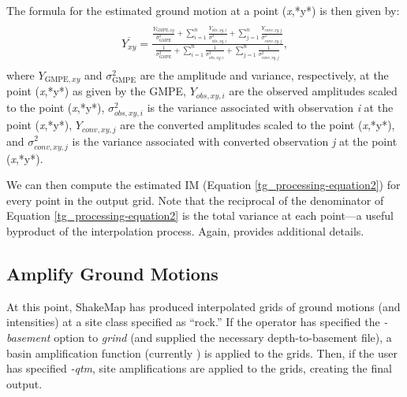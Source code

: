 \documentclass[letterpaper,10pt,english]{sphinxmanual}
\begin{document}
The formula for the estimated ground motion at a point (\emph{x},*y*) is then given by:
\label{tg_processing:equation-equation2}\begin{align}\label{tg_processing-equation2}\begin{aligned}
\begin{split}\overline{Y_{xy}} = \frac{\displaystyle\frac{Y_{\text{GMPE},xy}}{\sigma_{\text{GMPE}}^2} + \displaystyle\sum_{i=1}^{n}\frac{Y_{obs,xy,i}}{\sigma_{obs,xy,i}^2} + \displaystyle\sum_{j=1}^{n}\frac{Y_{conv,xy,j}}{\sigma_{conv,xy,j}^2}}{\displaystyle\frac{1}{\sigma_{\text{GMPE}}^2} + \displaystyle\sum_{i=1}^{n}\frac{1}{\sigma_{obs,xy,i}^2} + \displaystyle\sum_{j=1}^{n}\frac{1}{\sigma_{conv,xy,j}^2}},\end{split}\end{aligned}\end{align}
where \(Y_{\text{GMPE},xy}\) and \(\sigma_{\text{GMPE}}^2\) are the amplitude and variance, respectively, at the point (\emph{x},*y*)
as given by the GMPE, \(Y_{obs,xy,i}\) are the observed amplitudes scaled to the point (\emph{x},*y*),
\(\sigma_{obs,xy,i}^2\) is the variance associated with observation \emph{i} at the point (\emph{x},*y*), \(Y_{conv,xy,j}\) are the
converted amplitudes scaled to the point (\emph{x},*y*), and \(\sigma_{conv,xy,j}^2\) is the variance associated
with converted observation \emph{j} at the point (\emph{x},*y*).

We can then compute the estimated IM (Equation \eqref{tg_processing-equation2}) for every point in the output grid. Note that the
reciprocal of the denominator of Equation \eqref{tg_processing-equation2} is the total variance at each point---a useful
byproduct of the interpolation process. Again, {\hyperref[references:worden2010]{}} provides additional
details.


\subsection{Amplify Ground Motions}
\label{tg_processing:id1}\label{tg_processing:amplify-ground-motions}
At this point, ShakeMap has produced interpolated grids of ground motions (and
intensities) at a site class specified as ``rock.'' If the operator has specified the \emph{-basement}
option to \emph{grind} (and supplied the necessary depth-to-basement file), a
basin amplification function (currently {\hyperref[references:field2000]{}}) is applied to the grids. Then, if the user has
specified \emph{-qtm}, site amplifications are applied to the grids, creating the final output.
\end{document}
